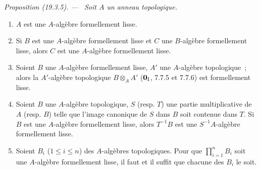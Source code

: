 \documentclass[10pt,oneside]{book}
\makeatletter
\newcommand{\setmanualcurrentlabel}[1]{\def\@currentlabel{#1}}
\newcommand{\oldpage}[2][]{%
  \setcounter{footnote}{0}%
  \marginpar{\scriptsize\textbf{#1}~|~#2}\ignorespaces}
\newenvironment{proposition}[1][]{%
  \setmanualcurrentlabel{#1}\par\medskip\noindent\itshape Proposition (#1). ---\ }{\par}
\makeatother
\begin{document}
\begin{proposition}[19.3.5]
\label{0.19.3.5-fr}
Soit $A$ un anneau topologique.
\begin{enumerate}
  \item[(i)] $A$ est une $A$-algèbre formellement lisse.
  \item[(ii)] Si $B$ est une $A$-algèbre formellement lisse et $C$ une
  $B$-algèbre formellement lisse, alors $C$ est une $A$-algèbre formellement
  lisse.
  \item[(iii)] Soient $B$ une $A$-algèbre formellement lisse, $A'$ une
  $A$-algèbre topologique~; alors la $A'$-algèbre topologique
  $B\otimes_A A'$ ($\mathbf 0_{\rm I}$, 7.7.5 et 7.7.6) est formellement
  lisse.
  \item[(iv)] Soient $B$ une $A$-algèbre topologique, $S$ (resp. $T$) une
  partie multiplicative de $A$ (resp. $B$) telle que l'image canonique de $S$
  dans $B$ soit contenue dans $T$. Si $B$ est une $A$-algèbre formellement
  lisse, alors $T^{-1}B$ est une $S^{-1}A$-algèbre formellement lisse.
  \item[(v)] Soient $B_i$ ($1\leq i\leq n$) des $A$-algèbres topologiques.
  Pour que $\prod_{i=1}^n B_i$ soit une $A$-algèbre formellement lisse, il
  faut et il suffit que chacune des $B_i$ le soit.
\end{enumerate}
\end{proposition}

\oldpage[0\textsubscript{IV-1}]{82}
\end{document}
